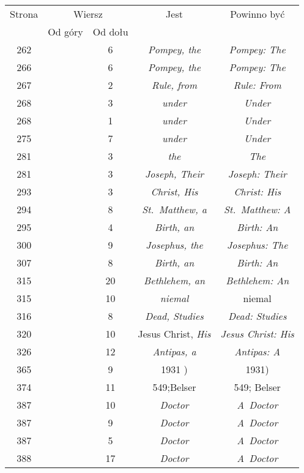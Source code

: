 \documentclass[a4paper,11pt]{article}
\begin{document}
\begin{center}
  \begin{tabular}{|c|c|c|c|c|}
    \hline
    Strona & \multicolumn{2}{c|}{Wiersz} & Jest
                              & Powinno być \\ \cline{2-3}
    & Od góry & Od dołu & & \\
    \hline
    262 & &  6 & \textit{Pompey, the} & \textit{Pompey: The} \\
    266 & &  6 & \textit{Pompey, the} & \textit{Pompey: The} \\
    267 & &  2 & \textit{Rule, from} & \textit{Rule: From} \\
    268 & &  3 & \textit{under} & \textit{Under} \\
    268 & &  1 & \textit{under} & \textit{Under} \\
    275 & &  7 & \textit{under} & \textit{Under} \\
    281 & &  3 & \textit{the} & \textit{The} \\
    281 & &  3 & \textit{Joseph, Their} & \textit{Joseph: Their} \\
    293 & &  3 & \textit{Christ, His} & \textit{Christ: His} \\
    294 & &  8 & \textit{St.~Matthew, a} & \textit{St.~Matthew: A} \\
    295 & &  4 & \textit{Birth, an} & \textit{Birth: An} \\
    300 & &  9 & \textit{Josephus, the} & \textit{Josephus: The} \\
    307 & &  8 & \textit{Birth, an} & \textit{Birth: An} \\
    315 & & 20 & \textit{Bethlehem, an} & \textit{Bethlehem: An} \\
    315 & & 10 & \textit{niemal} & niemal \\
    316 & &  8 & \textit{Dead, Studies} & \textit{Dead: Studies} \\
    320 & & 10 & Jesus Christ, \textit{His} & \textit{Jesus Christ: His} \\
    326 & & 12 & \textit{Antipas, a} & \textit{Antipas: A} \\
    365 & &  9 & 1931 ) & 1931) \\
    374 & & 11 & 549;Belser & 549; Belser \\
    387 & & 10 & \textit{Doctor} & \textit{A~Doctor} \\
    387 & &  9 & \textit{Doctor} & \textit{A~Doctor} \\
    387 & &  5 & \textit{Doctor} & \textit{A~Doctor} \\
    388 & & 17 & \textit{Doctor} & \textit{A~Doctor} \\

\end{tabular}
\end{center}
\end{document}
